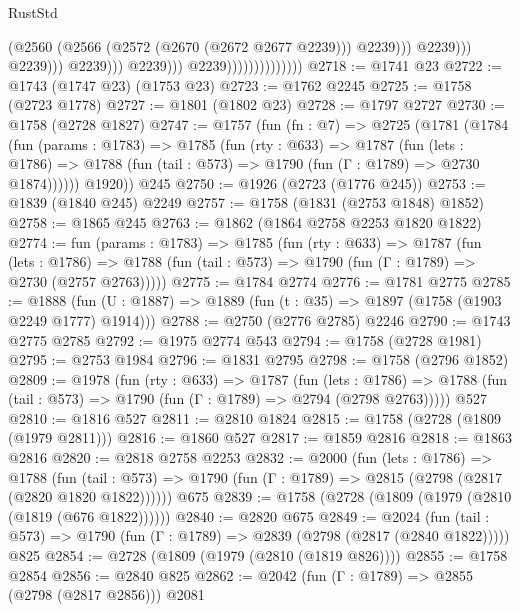 \begin{lexlean}{RustStd}
\begin{coremodule}
{\begin{coremodule}
{{{{{{{{{{{{{{{                                                          (@2560
                                                            (@2566
                                                              (@2572 (@2670 (@2672 @2677 @2239)))
                                                              @2239)))
                                                        @2239)))
                                                  @2239)))
                                            @2239)))
                                      @2239)))
                                @2239))))))))))))))
@2718 := @1741 @23
@2722 := @1743 (@1747 @23) (@1753 @23)
@2723 := @1762 @2245
@2725 := @1758 (@2723 @1778)
@2727 := @1801 (@1802 @23)
@2728 := @1797 @2727
@2730 := @1758 (@2728 @1827)
@2747 := @1757
    (fun (fn : @7) =>
    @2725
      (@1781
        (@1784
          (fun (params : @1783) =>
          @1785
            (fun (rty : @633) =>
            @1787
              (fun (lets : @1786) =>
              @1788 (fun (tail : @573) => @1790 (fun (Γ : @1789) => @2730 @1874))))))
        @1920))
    @245
@2750 := @1926 (@2723 (@1776 @245))
@2753 := @1839 (@1840 @245) @2249
@2757 := @1758 (@1831 (@2753 @1848) @1852)
@2758 := @1865 @245
@2763 := @1862 (@1864 @2758 @2253 @1820 @1822)
@2774 := fun (params : @1783) =>
  @1785
    (fun (rty : @633) =>
    @1787
      (fun (lets : @1786) =>
      @1788 (fun (tail : @573) => @1790 (fun (Γ : @1789) => @2730 (@2757 @2763)))))
@2775 := @1784 @2774
@2776 := @1781 @2775
@2785 := @1888 (fun (U : @1887) => @1889 (fun (t : @35) => @1897 (@1758 (@1903 @2249 @1777) @1914)))
@2788 := @2750 (@2776 @2785) @2246
@2790 := @1743 @2775 @2785
@2792 := @1975 @2774 @543
@2794 := @1758 (@2728 @1981)
@2795 := @2753 @1984
@2796 := @1831 @2795
@2798 := @1758 (@2796 @1852)
@2809 := @1978
    (fun (rty : @633) =>
    @1787
      (fun (lets : @1786) =>
      @1788 (fun (tail : @573) => @1790 (fun (Γ : @1789) => @2794 (@2798 @2763)))))
    @527
@2810 := @1816 @527
@2811 := @2810 @1824
@2815 := @1758 (@2728 (@1809 (@1979 @2811)))
@2816 := @1860 @527
@2817 := @1859 @2816
@2818 := @1863 @2816
@2820 := @2818 @2758 @2253
@2832 := @2000
    (fun (lets : @1786) =>
    @1788
      (fun (tail : @573) => @1790 (fun (Γ : @1789) => @2815 (@2798 (@2817 (@2820 @1820 @1822))))))
    @675
@2839 := @1758 (@2728 (@1809 (@1979 (@2810 (@1819 (@676 @1822))))))
@2840 := @2820 @675
@2849 := @2024
    (fun (tail : @573) => @1790 (fun (Γ : @1789) => @2839 (@2798 (@2817 (@2840 @1822)))))
    @825
@2854 := @2728 (@1809 (@1979 (@2810 (@1819 @826))))
@2855 := @1758 @2854
@2856 := @2840 @825
@2862 := @2042 (fun (Γ : @1789) => @2855 (@2798 (@2817 @2856))) @2081
}}}}}}}}}}}}}}}
\end{coremodule}}
\end{coremodule}
\end{lexlean}
